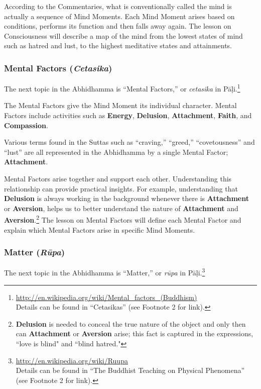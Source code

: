 According to the Commentaries, what is conventionally called the mind is actually a sequence of Mind Moments. Each Mind Moment arises based on conditions, performs its function and then falls away again. The lesson on Consciousness will describe a map of the mind from the lowest states of mind such as hatred and lust, to the highest meditative states and attainments.

\subsubsection*{Mental Factors (\textit{Cetasika})}

The next topic in the Abhidhamma is “Mental Factors,” or \textit{cetasika} in Pāḷi.\footnote{\url{http://en.wikipedia.org/wiki/Mental_factors_(Buddhism)}\\ Details can be found in “Cetasikas” (see Footnote 2 for link).}

The Mental Factors give the Mind Moment its individual character. Mental Factors include activities such as \textbf{Energy}, \textbf{Delusion}, \textbf{Attachment}, \textbf{Faith}, and \textbf{Compassion}. 

Various terms found in the Suttas such as “craving,” “greed,” “covetousness” and “lust” are all represented in the Abhidhamma by a single Mental Factor; \textbf{Attachment}. 

Mental Factors arise together and support each other. Understanding this relationship can provide practical insights. For example, understanding that \textbf{Delusion} is always working in the background whenever there is \textbf{Attachment} or \textbf{Aversion}, helps us to better understand the nature of \textbf{Attachment} and \textbf{Aversion}.\footnote{\textbf{Delusion} is needed to conceal the true nature of the object and only then can \textbf{Attachment} or \textbf{Aversion} arise; this fact is captured in the expressions, ``love is blind" and ``blind hatred."} The lesson on Mental Factors will define each Mental Factor and explain which Mental Factors arise in specific Mind Moments.

\pagebreak

\subsubsection*{Matter (\textit{Rūpa})}

The next topic in the Abhidhamma is “Matter,” or \textit{rūpa} in Pāḷi.\footnote{\url{http://en.wikipedia.org/wiki/Ruupa}\\ Details can be found in “The Buddhist Teaching on Physical Phenomena” (see Footnote 2 for link).}


